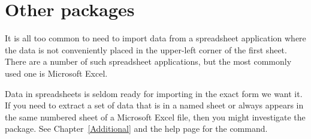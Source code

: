 \section{Other packages} 

 It is all too common to need to import data from a spreadsheet application where the data is not conveniently placed in the upper-left corner of the first sheet. There are a number of such spreadsheet applications, but the most commonly used one is Microsoft Excel.

Data in spreadsheets is seldom ready for importing in the exact form we want it. If you need to extract a set of data that is in a named sheet or always appears in the same numbered sheet of a Microsoft Excel file, then you might investigate the  package. See Chapter~\ref{Additional} and the help page for the  command.

 

